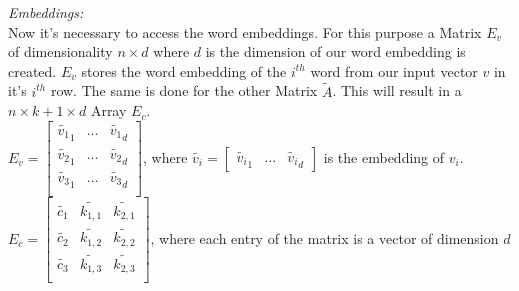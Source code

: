 \textit{Embeddings:}\\
Now it's necessary to access the word embeddings. For this purpose a Matrix $E_v$ of dimensionality $n \times d$ where $d$ is the dimension of our word embedding is created. $E_v$ stores the word embedding of the $i^{th}$ word from our input vector $v$ in it's $i^{th}$ row. The same is done for the other Matrix $\tilde{A}$. This will result in a $n \times k+1 \times d$ Array $E_c$. \\
$E_v = \begin{bmatrix}
\tilde{v_1}_1 & \ldots & \tilde{v_1}_d\\
\tilde{v_2}_1 & \ldots & \tilde{v_2}_d\\
\tilde{v_3}_1 & \ldots & \tilde{v_3}_d\\
\end{bmatrix}
$, where $\tilde{v_i} = \begin{bmatrix}
\tilde{v_i}_1 & \ldots & \tilde{v_i}_d \end{bmatrix}$ is the embedding of $v_i$. \\

$E_c = \begin{bmatrix}
\tilde{c_1 }& \tilde{k_{1,1}} & \tilde{k_{2,1}} \\
\tilde{c_2 }& \tilde{k_{1,2}}& \tilde{k_{2,2}} \\
\tilde{c_3 }&\tilde{ k_{1,3} }& \tilde{k_{2,3}}\\
\end{bmatrix}$,
where each entry of the matrix is a vector of dimension $d$\\

